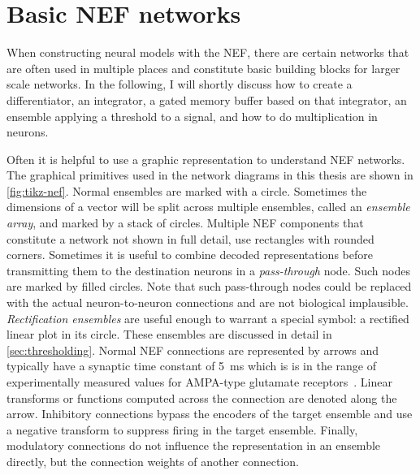 \chapter{Basic NEF networks}
When constructing neural models with the NEF, there are certain networks that are often used in multiple places and constitute basic building blocks for larger scale networks.
In the following, I will shortly discuss how to create a differentiator, an integrator, a gated memory buffer based on that integrator, an ensemble applying a threshold to a signal, and how to do multiplication in neurons.

Often it is helpful to use a graphic representation to understand NEF networks.
The graphical primitives used in the network diagrams in this thesis are shown in \cref{fig:tikz-nef}.
Normal ensembles are marked with a circle.
Sometimes the dimensions of a vector will be split across multiple ensembles, called an \emph{ensemble array}, and marked by a stack of circles.
Multiple NEF components that constitute a network not shown in full detail, use rectangles with rounded corners.
Sometimes it is useful to combine decoded representations before transmitting them to the destination neurons in a \emph{pass-through} node.
Such nodes are marked by filled circles.
Note that such pass-through nodes could be replaced with the actual neuron-to-neuron connections and are not biological implausible.
\emph{Rectification ensembles} are useful enough to warrant a special symbol: a rectified linear plot in its circle.
These ensembles are discussed in detail in \cref{sec:thresholding}.
Normal NEF connections are represented by arrows and typically have a synaptic time constant of \SI{5}{\milli\second} which is is in the range of experimentally measured values for AMPA-type glutamate receptors~\parencite{jonas1993,spruston1995-1}.
Linear transforms or functions computed across the connection are denoted along the arrow.
Inhibitory connections bypass the encoders of the target ensemble and use a negative transform to suppress firing in the target ensemble.
Finally, modulatory connections do not influence the representation in an ensemble directly, but the connection weights of another connection.
